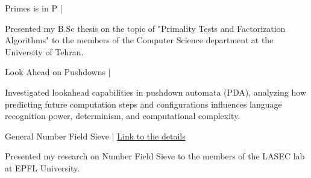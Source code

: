 \begin{cventries}
  \cvproject
  {Primes is in P {\normalfont |} }
  {}
  {
    \begin{cvitems}
      \item {Presented my B.Sc thesis on the topic of "Primality Tests and Factorization Algorithms" to the members of the Computer Science department at the University of Tehran.}
    \end{cvitems}
  }
  \vspace{-5pt}

  \cvproject
  {Look Ahead on Pushdowns {\normalfont |} }
  {}
  {
    \begin{cvitems}
      \item {Investigated lookahead capabilities in pushdown automata (PDA), analyzing how predicting future computation steps and configurations influences language recognition power, determinism, and computational complexity.}
    \end{cvitems}
  }
  \vspace{-5pt}

  \cvproject
  {General Number Field Sieve {\normalfont |} }
  {{\href{}{\faHome \; Link to the details}}}
  {
    \begin{cvitems}
      \item {Presented my research on Number Field Sieve to the members of the LASEC lab at EPFL University.}
    \end{cvitems}
  }
  \vspace{-5pt}
\end{cventries}
